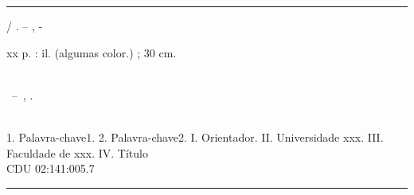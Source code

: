 \begin{fichacatalografica}
	\vspace*{\fill}					%
	\hrule							%
	\begin{center}					%
	\begin{minipage}[c]{12.5cm}		%
    	\imprimirautor
    
    	\hspace{0.5cm} \imprimirtitulo  / \imprimirautor. --
    	\imprimirlocal, \the\year-
    
    	\hspace{0.5cm} xx p. : il. (algumas color.) ; 30 cm.\\
    
    	\hspace{0.5cm} \imprimirorientadorRotulo~\imprimirorientador\\
    
    	\hspace{0.5cm}
    	\parbox[t]{\textwidth}{\imprimirtipotrabalho~--~\imprimirinstituicao,
    	\the\year.}\\
    
    	\hspace{0.5cm}
    		1. Palavra-chave1.
    		2. Palavra-chave2.
    		I. Orientador.
    		II. Universidade xxx.
    		III. Faculdade de xxx.
    		IV. Título\\
    
    	\hspace{8.75cm} CDU 02:141:005.7\\
	\end{minipage}
	\end{center}
	\hrule
\end{fichacatalografica}